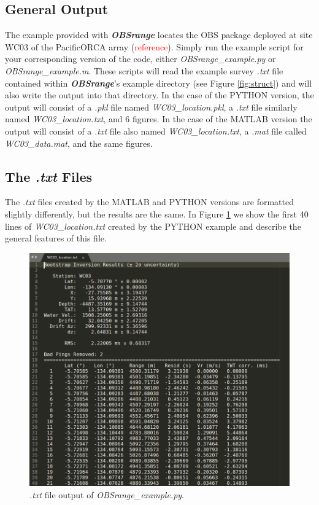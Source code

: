 \documentclass[titlepage, 12pt]{article}
\begin{document}
  \subsection{General Output}
  The example provided with \textbf{\textit{OBSrange}} locates the OBS package deployed at site WC03 of the PacificORCA array (\textcolor{red}{reference}). Simply run the example script for your corresponding version of the code, either \textit{OBSrange\_example.py} or \textit{OBSrange\_example.m}. These scripts will read the example survey \textit{.txt} file contained within \textbf{\textit{OBSrange}}'s  example directory (see Figure \ref{fig:struct}) and will also write the output into that directory.  In the case of the PYTHON version, the output will consist of a \textit{.pkl} file named \textit{WC03\_location.pkl}, a \textit{.txt} file similarly named \textit{WC03\_location.txt}, and 6 figures. In the case of the MATLAB version the output will consist of a \textit{.txt} file also named \textit{WC03\_location.txt}, a \textit{.mat} file called \textit{WC03\_data.mat}, and the same figures.

  \subsection{The \textit{.txt} Files}
  The \textit{.txt} files created by the MATLAB and PYTHON versions are formatted slightly differently, but the results are the same. In Figure \ref{fig:ex} we show the first 40 lines of \textit{WC03\_location.txt} created by the PYTHON example and describe the general features of this file.\\

  \begin{figure}[!htb]
   \includegraphics[width=\linewidth]{example_txt_fle.png}
   \caption{\textit{.txt} file output of \textit{OBSrange\_example.py}.}
   \label{fig:ex}
  \end{figure}
\end{document}
